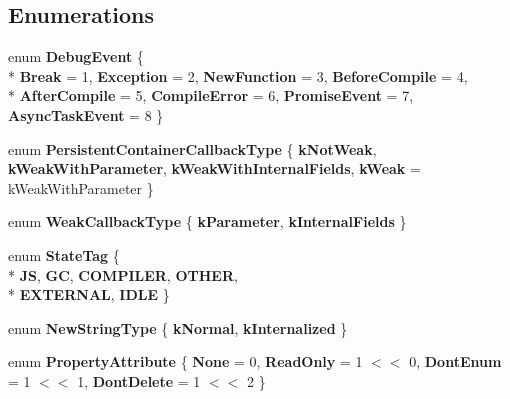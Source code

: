 \subsection*{Enumerations}
\begin{DoxyCompactItemize}
\item 
\hypertarget{namespacev8_a4157e857c3767e2b82686a53ae3da853}{}enum {\bfseries Debug\+Event} \{ \\*
{\bfseries Break} = 1, 
{\bfseries Exception} = 2, 
{\bfseries New\+Function} = 3, 
{\bfseries Before\+Compile} = 4, 
\\*
{\bfseries After\+Compile} = 5, 
{\bfseries Compile\+Error} = 6, 
{\bfseries Promise\+Event} = 7, 
{\bfseries Async\+Task\+Event} = 8
 \}\label{namespacev8_a4157e857c3767e2b82686a53ae3da853}

\item 
\hypertarget{namespacev8_ad2a33b8f8a1701a800a691dd025f7dde}{}enum {\bfseries Persistent\+Container\+Callback\+Type} \{ {\bfseries k\+Not\+Weak}, 
{\bfseries k\+Weak\+With\+Parameter}, 
{\bfseries k\+Weak\+With\+Internal\+Fields}, 
{\bfseries k\+Weak} = k\+Weak\+With\+Parameter
 \}\label{namespacev8_ad2a33b8f8a1701a800a691dd025f7dde}

\item 
\hypertarget{namespacev8_a68b2b90003e18980bc0b438c95be1005}{}enum {\bfseries Weak\+Callback\+Type} \{ {\bfseries k\+Parameter}, 
{\bfseries k\+Internal\+Fields}
 \}\label{namespacev8_a68b2b90003e18980bc0b438c95be1005}

\item 
\hypertarget{namespacev8_adb1bd0f9ef7cc084b6a94a5e1b420f69}{}enum {\bfseries State\+Tag} \{ \\*
{\bfseries J\+S}, 
{\bfseries G\+C}, 
{\bfseries C\+O\+M\+P\+I\+L\+E\+R}, 
{\bfseries O\+T\+H\+E\+R}, 
\\*
{\bfseries E\+X\+T\+E\+R\+N\+A\+L}, 
{\bfseries I\+D\+L\+E}
 \}\label{namespacev8_adb1bd0f9ef7cc084b6a94a5e1b420f69}

\item 
\hypertarget{namespacev8_ac9163ab12fb3b2a95907a3a0367c6095}{}enum {\bfseries New\+String\+Type} \{ {\bfseries k\+Normal}, 
{\bfseries k\+Internalized}
 \}\label{namespacev8_ac9163ab12fb3b2a95907a3a0367c6095}

\item 
\hypertarget{namespacev8_a05f25f935e108a1ea2d150e274602b87}{}enum {\bfseries Property\+Attribute} \{ {\bfseries None} = 0, 
{\bfseries Read\+Only} = 1 $<$$<$ 0, 
{\bfseries Dont\+Enum} = 1 $<$$<$ 1, 
{\bfseries Dont\+Delete} = 1 $<$$<$ 2
 \}\label{namespacev8_a05f25f935e108a1ea2d150e274602b87}


\end{DoxyCompactItemize}
